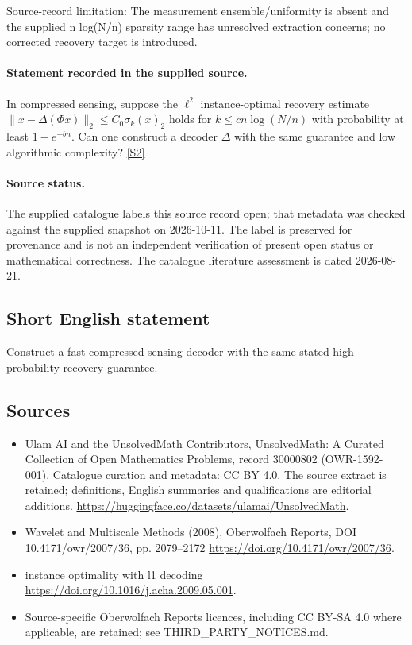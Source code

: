 \documentclass[11pt]{article}
\begin{document}
Source-record limitation: The measurement ensemble/uniformity is absent and the supplied n log(N/n) sparsity range has unresolved extraction concerns; no corrected recovery target is introduced.
\paragraph{Statement recorded in the supplied source.}
In compressed sensing, suppose the $\ell^2$ instance-optimal recovery estimate $\lVert x-\Delta(\Phi x)\rVert_2\leq C_0\sigma_k(x)_2$ holds for $k\leq cn\log(N/n)$ with probability at least $1-e^{-bn}$. Can one construct a decoder $\Delta$ with the same guarantee and low algorithmic complexity? \href{https://doi.org/10.4171/owr/2007/36}{[S2]}
\paragraph{Source status.}
The supplied catalogue labels this source record open; that metadata was checked against the supplied snapshot on 2026-10-11. The label is preserved for provenance and is not an independent verification of present open status or mathematical correctness. The catalogue literature assessment is dated 2026-08-21.
\subsection{Short English statement}
Construct a fast compressed-sensing decoder with the same stated high-probability recovery guarantee.
\subsection{Sources}
\begin{itemize}
\item[S1] Ulam AI and the UnsolvedMath Contributors, UnsolvedMath: A Curated Collection of Open Mathematics Problems, record 30000802 (OWR-1592-001). Catalogue curation and metadata: CC BY 4.0. The source extract is retained; definitions, English summaries and qualifications are editorial additions.
\url{https://huggingface.co/datasets/ulamai/UnsolvedMath}.
\item[S2] Wavelet and Multiscale Methods (2008), Oberwolfach Reports, DOI 10.4171/owr/2007/36, pp. 2079--2172
\url{https://doi.org/10.4171/owr/2007/36}.
\item[S3] instance optimality with l1 decoding
\url{https://doi.org/10.1016/j.acha.2009.05.001}.
\item Source-specific Oberwolfach Reports licences, including CC BY-SA 4.0 where applicable, are retained; see THIRD\_PARTY\_NOTICES.md.
\end{itemize}
\end{document}
